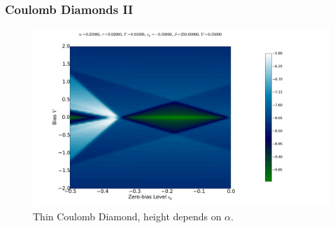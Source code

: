 \begin{frame}
    \frametitle{Coulomb Diamonds II}
    \vspace{-3mm}
    \begin{figure}[!b] 
        \centering
        \includegraphics[height=.85\textheight, width=\textwidth]{res/current_map_diamond_alpha_025.pdf}
        \vspace{-6mm}
        \caption{Thin Coulomb Diamond, height depends on $\alpha$.}
    \end{figure} 
\end{frame}
